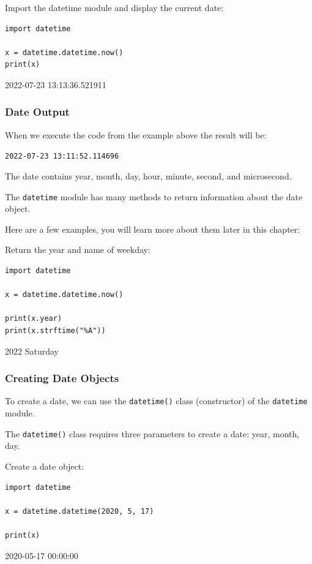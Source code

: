\documentclass[12pt,a4paper]{article}
\newcommand{\code}[1]{%
	\colorbox{backcolour}{\lstinline{#1}}%
}
\begin{document}
\begin{ebox}
Import the datetime module and display the current date:
	\begin{lstlisting}
import datetime

x = datetime.datetime.now()
print(x)
	\end{lstlisting}
\tcblower
	\begin{vercode}
2022-07-23 13:13:36.521911
	\end{vercode}
\end{ebox}
\subsubsection{Date Output}

When we execute the code from the example above the result will be:

\code{2022-07-23 13:11:52.114696}

The date contains year, month, day, hour, minute, second, and microsecond.

The \code{datetime} module has many methods to return information about
the date object.

Here are a few examples, you will learn more about them later in this
chapter:

\begin{ebox}
Return the year and name of weekday:
	\begin{lstlisting}
import datetime

x = datetime.datetime.now()

print(x.year)
print(x.strftime("%A"))
	\end{lstlisting}
\tcblower
	\begin{vercode}
2022
Saturday
	\end{vercode}
\end{ebox}
\subsubsection{Creating Date Objects}

To create a date, we can use the \code{datetime()} class (constructor) of
the \code{datetime} module.

The \code{datetime()} class requires three parameters to create a date:
year, month, day.

\begin{ebox}
Create a date object:
	\begin{lstlisting}
import datetime

x = datetime.datetime(2020, 5, 17)

print(x)
	\end{lstlisting}
\tcblower
	\begin{vercode}
2020-05-17 00:00:00
	\end{vercode}
\end{ebox}
\end{document}

